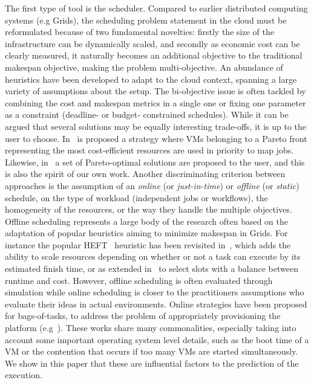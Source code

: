 \documentclass[10pt,conference,compsocconf]{IEEEtran}
\begin{document}
The first type of tool is the scheduler. Compared to earlier distributed
computing systems  (e.g Grids),  the scheduling problem  statement in  the cloud
must be reformulated because of two fundamental novelties: firstly the size of the
infrastructure can be dynamically scaled, and secondly as economic cost can be
clearly measured, it naturally becomes an additional objective to the traditional
makespan  objective,  making  the   problem  multi-objective.   An abundance  of
heuristics have been  developed to adapt to the cloud  context, spanning a large
variety of assumptions about the setup.  The bi-objective issue is often tackled
by  combining the  cost and  makespan  metrics in  a  single one  or fixing  one
parameter as a constraint (deadline- or budget- constrained schedules). While it
can be argued  that several solutions may be equally  interesting trade-offs,
it is up to the user to choose.  In~\cite{Su13} is proposed a strategy where VMs
belonging to a  Pareto front representing the most  cost-efficient resources are
used  in  priority  to  map  jobs.  Likewise,  in~\cite{Durillo14}  a  set  of
Pareto-optimal solutions are  proposed to the user, and this  is also the spirit
of our  own work.   Another discriminating criterion  between approaches  is the
assumption of  an \emph{online}  (or \emph{just-in-time}) or  \emph{offline} (or
\emph{static})  schedule,  on   the  type  of  workload   (independent  jobs  or
workflows),  the homogeneity  of  the resources,  or the  way  they handle  the
multiple objectives.  Offline scheduling represents a large body of the research 
often based  on the adaptation of popular heuristics  aiming to minimize
makespan in Grids.  For instance  the popular HEFT~\cite{Zhao2003} heuristic has
been  revisited in~\cite{LinL11},  which  adds the  ability  to scale  resources
depending on whether or not a task  can execute by its estimated finish time, or
as extended in~\cite{Li11cost-conscious} to select  slots with a balance between
runtime  and  cost.  However,  offline  scheduling  is often  evaluated  through
simulation while online scheduling is closer to the practitioners assumptions 
who evaluate  their ideas  in actual environments.   Online strategies have been
proposed  for  bags-of-tasks, to address  the problem  of  appropriately
provisioning                             the                            platform
(e.g~\cite{MarshallKF10,GenaudG11,DuongLG11,VillegasASI12}).  These  works share
many  commonalities, especially taking  into account  some important  operating
system level details, such as the boot time of a VM or the contention that occurs
if too many VMs are started simultaneously. We show in this paper that these are
influential factors to the prediction of the execution.
  
\end{document}
